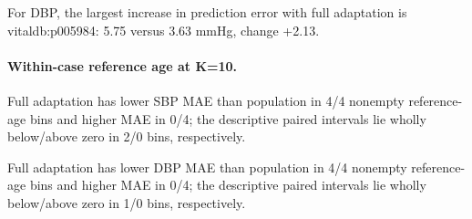 \documentclass[11pt]{article}
\begin{document}
For DBP, the largest increase in prediction error with full adaptation is vitaldb:p005984: 5.75 versus 3.63 mmHg, change +2.13.

\paragraph{Within-case reference age at K=10.}

Full adaptation has lower SBP MAE than population in 4/4 nonempty reference-age bins and higher MAE in 0/4; the descriptive paired intervals lie wholly below/above zero in 2/0 bins, respectively.

Full adaptation has lower DBP MAE than population in 4/4 nonempty reference-age bins and higher MAE in 0/4; the descriptive paired intervals lie wholly below/above zero in 1/0 bins, respectively.
\end{document}
